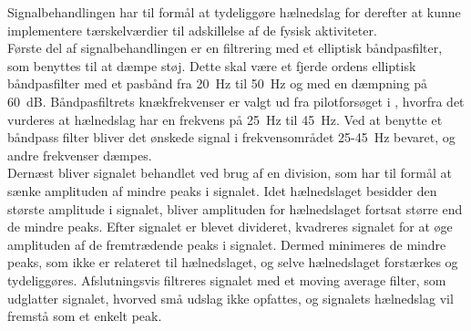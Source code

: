 Signalbehandlingen har til formål at tydeliggøre hælnedslag for derefter at kunne implementere tærskelværdier til adskillelse af de fysisk aktiviteter. \\
Første del af signalbehandlingen er en filtrering med et elliptisk båndpasfilter, som benyttes til at dæmpe støj. Dette skal være et fjerde ordens elliptisk båndpasfilter med et pasbånd fra 20~Hz til 50~Hz og med en dæmpning på 60~dB. Båndpasfiltrets knækfrekvenser er valgt ud fra pilotforsøget i , hvorfra det vurderes at hælnedslag har en frekvens på 25~Hz til 45~Hz. Ved at benytte et båndpass filter bliver det ønskede signal i frekvensområdet 25-45~Hz bevaret, og andre frekvenser dæmpes.\\
Dernæst bliver signalet behandlet ved brug af en division, som har til formål at sænke amplituden af mindre peaks i signalet. Idet hælnedslaget besidder den største amplitude i signalet, bliver amplituden for hælnedslaget fortsat større end de mindre peaks. Efter signalet er blevet divideret, kvadreres signalet for at øge amplituden af de fremtrædende peaks i signalet. Dermed minimeres de mindre peaks, som ikke er relateret til hælnedslaget, og selve hælnedslaget forstærkes og tydeliggøres. Afslutningsvis filtreres signalet med et moving average filter, som udglatter signalet, hvorved små udslag ikke opfattes, og signalets hælnedslag vil fremstå som et enkelt peak.

